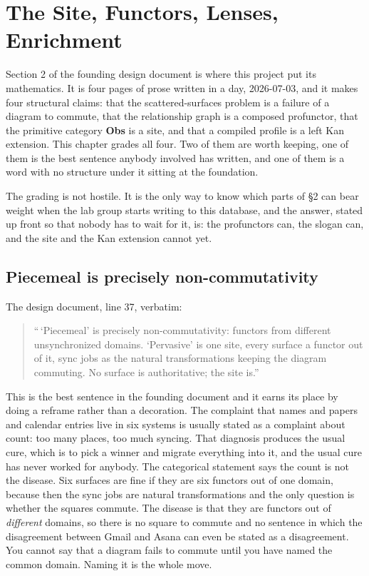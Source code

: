 \chapter{The Site, Functors, Lenses, Enrichment}

Section 2 of the founding design document is where this project put its mathematics. It is four pages of prose written in a day, 2026-07-03, and it makes four structural claims: that the scattered-surfaces problem is a failure of a diagram to commute, that the relationship graph is a composed profunctor, that the primitive category \textbf{Obs} is a site, and that a compiled profile is a left Kan extension. This chapter grades all four. Two of them are worth keeping, one of them is the best sentence anybody involved has written, and one of them is a word with no structure under it sitting at the foundation.

The grading is not hostile. It is the only way to know which parts of \S2 can bear weight when the lab group starts writing to this database, and the answer, stated up front so that nobody has to wait for it, is: the profunctors can, the slogan can, and the site and the Kan extension cannot yet.

\section{Piecemeal is precisely non-commutativity}

The design document, line 37, verbatim:

\begin{quote}
``\,`Piecemeal' is precisely non-commutativity: functors from different unsynchronized domains. `Pervasive' is one site, every surface a functor out of it, sync jobs as the natural transformations keeping the diagram commuting. No surface is authoritative; the site is.''
\end{quote}

This is the best sentence in the founding document and it earns its place by doing a reframe rather than a decoration. The complaint that names and papers and calendar entries live in six systems is usually stated as a complaint about count: too many places, too much syncing. That diagnosis produces the usual cure, which is to pick a winner and migrate everything into it, and the usual cure has never worked for anybody. The categorical statement says the count is not the disease. Six surfaces are fine if they are six functors out of one domain, because then the sync jobs are natural transformations and the only question is whether the squares commute. The disease is that they are functors out of \emph{different} domains, so there is no square to commute and no sentence in which the disagreement between Gmail and Asana can even be stated as a disagreement. You cannot say that a diagram fails to commute until you have named the common domain. Naming it is the whole move.

